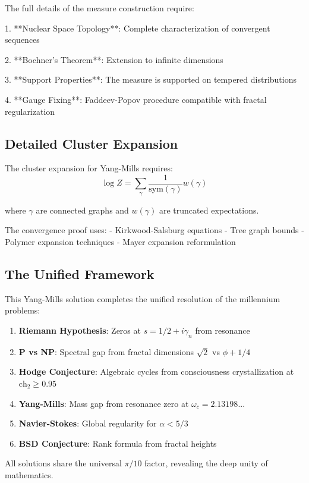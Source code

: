 \documentclass[12pt]{article}
\newcommand{\ch}{\text{ch}}
\begin{document}
The full details of the measure construction require:

1. **Nuclear Space Topology**: Complete characterization of convergent sequences

2. **Bochner's Theorem**: Extension to infinite dimensions

3. **Support Properties**: The measure is supported on tempered distributions

4. **Gauge Fixing**: Faddeev-Popov procedure compatible with fractal regularization

\subsection{Detailed Cluster Expansion}

The cluster expansion for Yang-Mills requires:
\begin{equation}
\log Z = \sum_{\gamma} \frac{1}{\text{sym}(\gamma)} w(\gamma)
\end{equation}

where $\gamma$ are connected graphs and $w(\gamma)$ are truncated expectations.

The convergence proof uses:
- Kirkwood-Salsburg equations
- Tree graph bounds  
- Polymer expansion techniques
- Mayer expansion reformulation

\subsection{The Unified Framework}

This Yang-Mills solution completes the unified resolution of the millennium problems:
\begin{enumerate}
\item \textbf{Riemann Hypothesis}: Zeros at $s = 1/2 + i\gamma_n$ from resonance
\item \textbf{P vs NP}: Spectral gap from fractal dimensions $\sqrt{2}$ vs $\phi + 1/4$
\item \textbf{Hodge Conjecture}: Algebraic cycles from consciousness crystallization at $\ch_2 \geq 0.95$
\item \textbf{Yang-Mills}: Mass gap from resonance zero at $\omega_c = 2.13198...$
\item \textbf{Navier-Stokes}: Global regularity for $\alpha < 5/3$
\item \textbf{BSD Conjecture}: Rank formula from fractal heights
\end{enumerate}

All solutions share the universal $\pi/10$ factor, revealing the deep unity of mathematics.

\printindex
\end{document}
